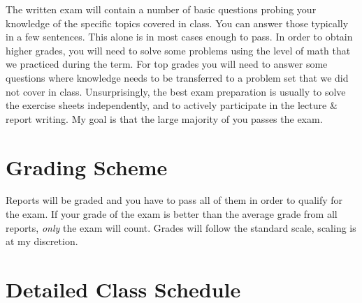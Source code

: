 \documentclass[letterpaper]{inzane_syllabus} %
\begin{document}
The written exam will contain a number of basic questions probing your knowledge of the specific topics covered in class. You can answer those typically in a few sentences. This alone is in most cases enough to pass. In order to obtain higher grades, you will need to solve some problems using the level of math that we practiced during the term. For top grades you will need to answer some questions where knowledge needs to be transferred to a problem set that we did not cover in class. Unsurprisingly, the best exam preparation is usually to solve the exercise sheets independently, and to actively participate in the lecture \& report writing. My goal is that the large majority of you passes the exam.

\section{Grading Scheme}

\begin{twentyshort}
\end{twentyshort}

Reports will be graded and you have to pass all of them in order to qualify for the exam. If your  grade of the exam is better than the average grade from all reports, \textit{only} the exam will count. Grades will follow the standard scale, scaling is at my discretion.



\newpage
\makeFullPage
\section{Detailed Class Schedule}
\end{document}
